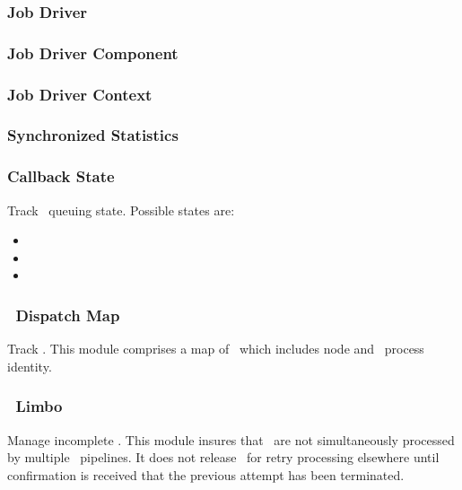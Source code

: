 \begin{itemize}
    \subsubsection{Job Driver}
        
    \subsubsection{Job Driver Component}
        
    \subsubsection{Job Driver Context}
        
    \subsubsection{Synchronized Statistics}
        
    \subsubsection{Callback State}
    
    Track \varWorkItem~queuing state.
    Possible states are:
    
    \begin{itemize} 
      \item \varPendingQueued
      \item \varPendingAssigned
      \item \varNotPending
    \end{itemize}    
    
    \subsubsection{\varCAS~Dispatch Map}
    
    Track \varWorkItems.
    This module comprises a map of \varWorkItems~which includes node and \varLinux~process identity.
    
    \subsubsection{\varCAS~Limbo}
    
    Manage incomplete \varWorkItems.
    This module insures that \varWorkItems~are not simultaneously processed
    by multiple \varUIMA~pipelines.
    It does not release \varWorkItems~for retry processing elsewhere until
    confirmation is received that the previous attempt has been terminated.
    

\end{itemize}

